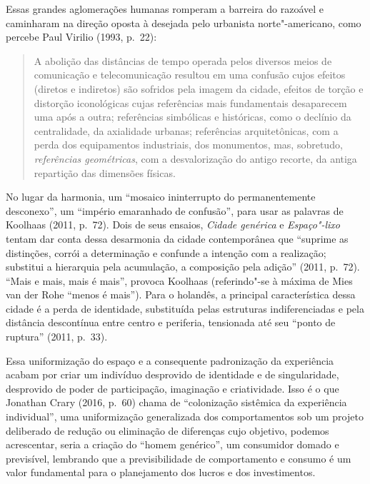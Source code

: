 Essas grandes aglomerações humanas romperam a barreira do razoável e
caminharam na direção oposta à desejada pelo urbanista norte"-americano,
como percebe Paul Virilio (1993, p.~22):

\begin{quote}
A abolição das distâncias de tempo operada pelos diversos meios de
comunicação e telecomunicação resultou em uma confusão cujos efeitos
(diretos e indiretos) são sofridos pela imagem da cidade, efeitos de
torção e distorção iconológicas cujas referências mais fundamentais
desaparecem uma após a outra; referências simbólicas e históricas, como
o declínio da centralidade, da axialidade urbanas; referências
arquitetônicas, com a perda dos equipamentos industriais, dos
monumentos, mas, sobretudo, \emph{referências geométricas}, com a
desvalorização do antigo recorte, da antiga repartição das dimensões
físicas.
\end{quote}

No lugar da harmonia, um ``mosaico ininterrupto do permanentemente
desconexo'', um ``império emaranhado de confusão'', para usar as
palavras de Koolhaas (2011, p.~72).
Dois de seus ensaios, \emph{Cidade genérica} e \emph{Espaço"-lixo} tentam
dar conta dessa desarmonia da cidade contemporânea que ``suprime as
distinções, corrói a determinação e confunde a intenção com a
realização; substitui a hierarquia pela acumulação, a composição pela
adição'' (2011, p.~72). ``Mais e mais, mais é mais'', provoca Koolhaas
(referindo"-se à máxima de Mies van der Rohe ``menos é mais''). Para o
holandês, a principal característica dessa cidade é a perda de
identidade, substituída pelas estruturas indiferenciadas e pela
distância descontínua entre centro e periferia, tensionada até seu
``ponto de ruptura'' (2011, p.~33).

Essa uniformização do espaço e a consequente padronização da experiência
acabam por criar um indivíduo desprovido de identidade e de
singularidade, desprovido de poder de participação, imaginação e
criatividade. Isso é o que Jonathan Crary (2016, p.~60) chama de
``colonização sistêmica da experiência individual'', uma uniformização
generalizada dos comportamentos sob um projeto deliberado de redução ou
eliminação de diferenças cujo objetivo, podemos acrescentar, seria a
criação do ``homem genérico'', um consumidor domado e previsível,
lembrando que a previsibilidade de comportamento e consumo é um valor
fundamental para o planejamento dos lucros e dos investimentos.

